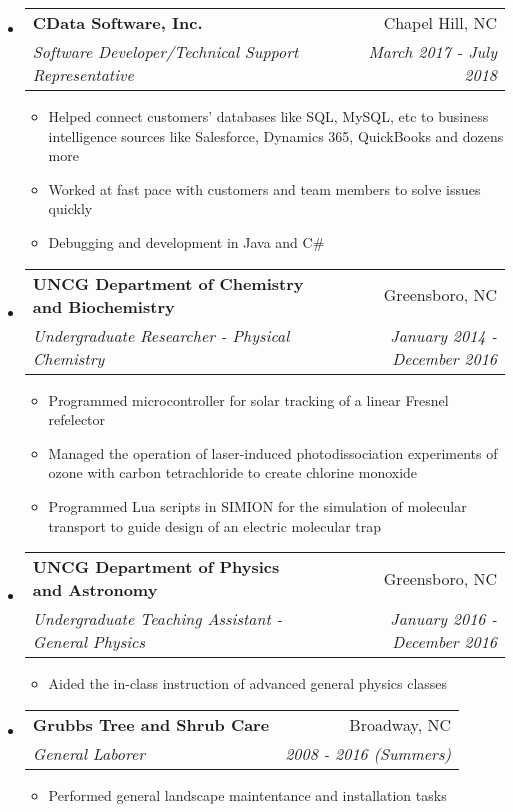 \documentclass[letterpaper,11pt]{article}
\makeatletter
\newcommand{\resitem}[1]{\item #1 \vspace{-2pt}}
\newcommand{\ressubheading}[4]{
\begin{tabular*}{6.5in}{l@{\cftdotfill{\cftsecdotsep}\extracolsep{\fill}}r}
		\textbf{#1} & #2 \\
		\textit{#3} & \textit{#4} \\
\end{tabular*}\vspace{-6pt}}
\makeatother
\begin{document}
\begin{itemize}
\begin{itemize}
	\end{itemize}

\item
	\ressubheading{CData Software, Inc.}{Chapel Hill, NC}{Software Developer/Technical Support Representative}{March 2017 - July 2018}
	\begin{itemize}
      \resitem{Helped connect customers' databases like SQL, MySQL, etc to business intelligence sources like Salesforce, Dynamics 365, QuickBooks and dozens more }
      \resitem{Worked at fast pace with customers and team members to solve issues quickly}
      \resitem{Debugging and development in Java and C\#}
      
	\end{itemize}

\item
	\ressubheading{UNCG Department of Chemistry and Biochemistry}{Greensboro, NC}{Undergraduate Researcher - Physical Chemistry}{January 2014 - December 2016}
	\begin{itemize}
      \resitem{Programmed microcontroller for solar tracking of a linear Fresnel refelector }
      \resitem{Managed the operation of laser-induced photodissociation experiments of ozone with carbon tetrachloride to create chlorine monoxide}
      \resitem{Programmed Lua scripts in SIMION for the simulation of molecular transport to guide design of an electric molecular trap
}
	\end{itemize}

\item
	\ressubheading{UNCG Department of Physics and Astronomy}{Greensboro, NC}{Undergraduate Teaching Assistant - General Physics}{January 2016 - December 2016}
	\begin{itemize}
      \resitem{Aided the in-class instruction of advanced general physics classes}
     
	\end{itemize}
	
\item
	\ressubheading{Grubbs Tree and Shrub Care}{Broadway, NC}{General Laborer}{2008 - 2016 (Summers)}
	\begin{itemize}
      \resitem{Performed general landscape maintentance and installation tasks}
     
	\end{itemize}

\end{itemize}

%
\end{document}
